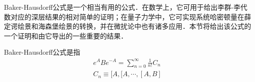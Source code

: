 

Baker-Hausdorff公式是一个相当有用的公式．在数学上，它可用于给出李群-李代数对应的深层结果的相对简单的证明；在量子力学中，它可实现系统哈密顿量在薛定谔绘景和海森堡绘景的转换，并在微扰论中也有诸多应用．本节将给出该公式的一个证明和由它导出的一些重要的结果．

Baker-Hausdorff公式是指
\begin{equation}
\begin{aligned}
e^{A}Be^{-A}=\sum_{n=0}^{\infty}\frac{1}{n!}C_n\\
C_n\equiv[A,[A,\cdots,[A,B]
\end{aligned}
\end{equation}
